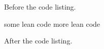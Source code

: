 \documentclass{article}
\begin{document}
Before the code listing.
\begin{leancode}
some lean code
more lean code
\end{leancode}
After the code listing.
\end{document}
